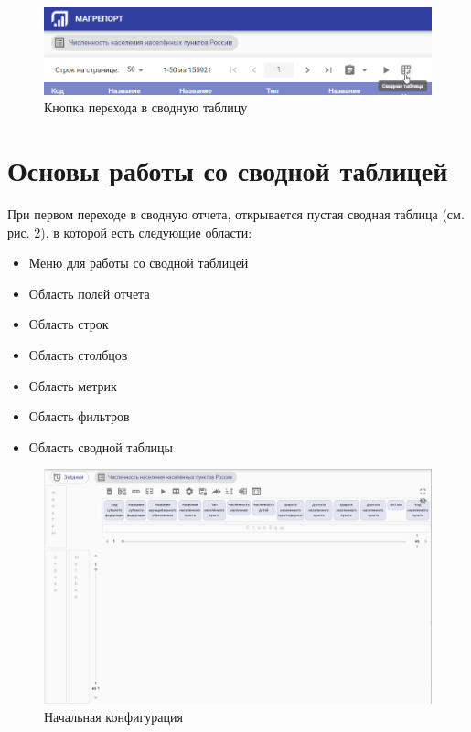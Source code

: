 \documentclass[../user-manual.tex]{subfiles}
\begin{document}
	\begin{figure}[h]
		\centering
		\includegraphics[width=\graphicswidth]{img/1-open-pivot-button.png}
		\caption{Кнопка перехода в сводную таблицу}
		\label{fig:open-pivot-button}
	\end{figure}	
	
	\section{Основы работы со сводной таблицей}
	При первом переходе в сводную отчета, открывается пустая сводная таблица (см. рис. \ref{fig:empty-pivot}), в которой есть следующие области:

	\begin{itemize}
		
		\item Меню для работы со сводной таблицей
		
		\item Область полей отчета
		
		\item Область строк
		
		\item Область столбцов
		
		\item Область метрик
		
		\item Область фильтров
		
		\item Область сводной таблицы
	\end{itemize}
				
	\begin{figure}[h]
		\centering
		\includegraphics[width=\graphicswidth]{img/2-empty-pivot.png}
		\caption{Начальная конфигурация}
		\label{fig:empty-pivot}
	\end{figure}	
\end{document}
